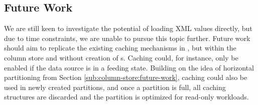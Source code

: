 \subsection{Future Work}
\label{sub:Future Work}
We are still keen to investigate the potential of loading XML values directly, but due to time constraints, we are unable to pursue this topic further. Future work should aim to replicate the existing caching mechanisms in \gap, but within the column store and without creation of s. Caching could, for instance, only be enabled if the data source is in a feeding state. Building on the idea of horizontal partitioning from Section \ref{sub:column-store:future-work}, caching could also be used in newly created partitions, and once a partition is full, all caching structures are discarded and the partition is optimized for read-only workloads.
